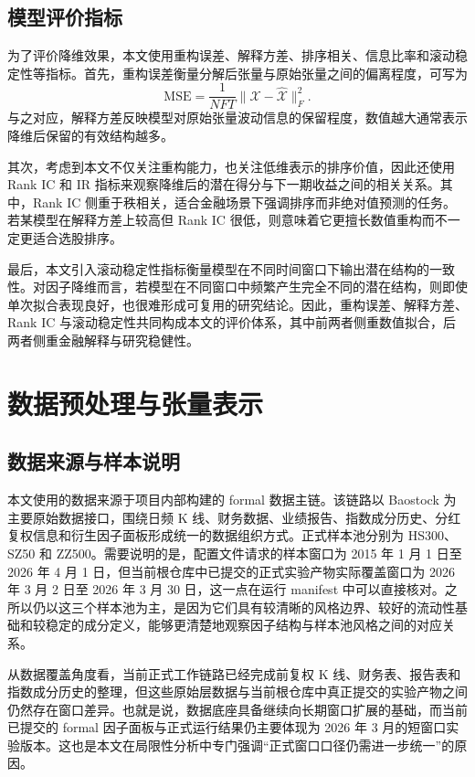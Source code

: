 \section{模型评价指标}

为了评价降维效果，本文使用重构误差、解释方差、排序相关、信息比率和滚动稳定性等指标。首先，重构误差衡量分解后张量与原始张量之间的偏离程度，可写为
\begin{equation}
\mathrm{MSE}=\frac{1}{NFT}\|\mathcal{X}-\hat{\mathcal{X}}\|_F^2.
\end{equation}
与之对应，解释方差反映模型对原始张量波动信息的保留程度，数值越大通常表示降维后保留的有效结构越多。

其次，考虑到本文不仅关注重构能力，也关注低维表示的排序价值，因此还使用 Rank IC 和 IR 指标来观察降维后的潜在得分与下一期收益之间的相关关系。其中，Rank IC 侧重于秩相关，适合金融场景下强调排序而非绝对值预测的任务。若某模型在解释方差上较高但 Rank IC 很低，则意味着它更擅长数值重构而不一定更适合选股排序。

最后，本文引入滚动稳定性指标衡量模型在不同时间窗口下输出潜在结构的一致性。对因子降维而言，若模型在不同窗口中频繁产生完全不同的潜在结构，则即使单次拟合表现良好，也很难形成可复用的研究结论。因此，重构误差、解释方差、Rank IC 与滚动稳定性共同构成本文的评价体系，其中前两者侧重数值拟合，后两者侧重金融解释与研究稳健性。

\chapter{数据预处理与张量表示}

\section{数据来源与样本说明}

本文使用的数据来源于项目内部构建的 formal 数据主链。该链路以 Baostock 为主要原始数据接口，围绕日频 K 线、财务数据、业绩报告、指数成分历史、分红复权信息和衍生因子面板形成统一的数据组织方式。正式样本池分别为 HS300、SZ50 和 ZZ500。需要说明的是，配置文件请求的样本窗口为 2015 年 1 月 1 日至 2026 年 4 月 1 日，但当前根仓库中已提交的正式实验产物实际覆盖窗口为 2026 年 3 月 2 日至 2026 年 3 月 30 日，这一点在运行 manifest 中可以直接核对。之所以仍以这三个样本池为主，是因为它们具有较清晰的风格边界、较好的流动性基础和较稳定的成分定义，能够更清楚地观察因子结构与样本池风格之间的对应关系。

从数据覆盖角度看，当前正式工作链路已经完成前复权 K 线、财务表、报告表和指数成分历史的整理，但这些原始层数据与当前根仓库中真正提交的实验产物之间仍然存在窗口差异。也就是说，数据底座具备继续向长期窗口扩展的基础，而当前已提交的 formal 因子面板与正式运行结果仍主要体现为 2026 年 3 月的短窗口实验版本。这也是本文在局限性分析中专门强调“正式窗口口径仍需进一步统一”的原因。

